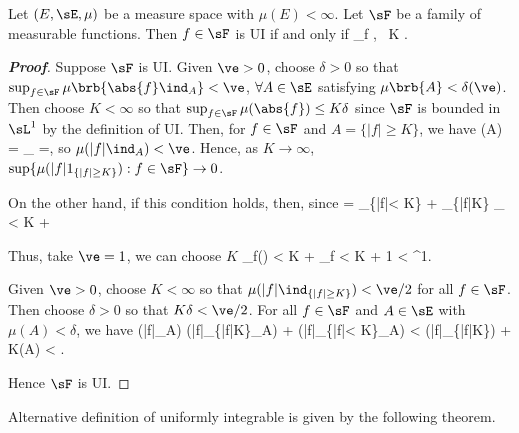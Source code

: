 \begin{lemma}\label{lem:uniformly_integrable_finite_measure}
Let $(E,\sE,\mu)$ be a measure space with $\mu(E)<\infty$. Let $\sF$ be a family of measurable functions. Then $f\in \sF$ is UI if and only if \be \sup_{f \in \sF} \mu{} ,
\quad {}\ K \to \infty. \ee
\end{lemma}

\begin{proof}[\bf Proof]
Suppose $\sF$ is UI. Given $\ve > 0$, choose $\delta > 0$ so that $\sup_{f\in \sF}\mu\brb{\abs{f}\ind_A} < \ve$, $\forall A\in \sE$ satisfying $\mu\brb{A} < \delta(\ve)$.
Then choose $K < \infty$ so that $\sup_{f\in \sF}\mu(\abs{f}) \leq K\delta$ since $\sF$ is bounded in $\sL^1$ by the definition of UI. Then, for $f\in \sF$ and $A = \{|f| \geq K\}$, we have
\be
\mu(A) = _{} \leq {} \leq {} =\delta,
\ee
so $\mu(|f|\ind_A) < \ve$. Hence, as $K \to \infty$, $\sup\{\mu(|f|1_{\{|f|\geq K\}}) : f\in \sF\} \to 0$.

On the other hand, if this condition holds, then, since
\beast
{} = \ind_{\{|f|< K\}} + \ind_{\{|f|\geq K\}} \quad \ra \quad {}_{} \quad \ra\quad \mu{} < K\mu{} + 
\eeast

Thus, take $\ve=1$, we can choose $K$ \be \sup_{f\in \sF}\mu() < K\mu{} + \sup_{f\in \sF} < K\mu{} + 1 < \infty\quad\ra\quad \sF {}\sL^1. \ee

Given $\ve > 0$, choose $K < \infty$ so that $\mu(|f|\ind_{\{|f|\geq K\}}) < \ve/2$ for all $f \in \sF$. Then choose $\delta > 0$ so that $K\delta < \ve/2$. For all $f \in \sF$ and $A \in \sE$ with
$\mu(A) < \delta$, we have \be \mu(|f|\ind_A) \leq \mu(|f|\ind_{\{|f|\geq K\}}\ind_A) + \mu(|f|\ind_{\{|f|< K\}}\ind_A) < \mu(|f|\ind_{\{|f|\geq K\}})  + K\mu(A) < \ve. \ee

Hence $\sF$ is UI.
\end{proof}

Alternative definition of uniformly integrable is given by the following theorem.

